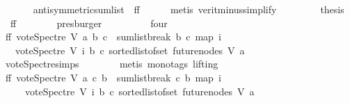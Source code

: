 \begin{isabellebody}
\ \ \ \ \isamarkupfalse%
\ \ antisymmetric{\isacharunderscore}{\kern0pt}sumlist\ {}\ ff{}\isanewline
\ \ \ \ \isamarkupfalse%
\ {\isacharparenleft}{\kern0pt}metis\ verit{\isacharunderscore}{\kern0pt}minus{\isacharunderscore}{\kern0pt}simplify{\isacharparenleft}{\kern0pt}{}{\isacharparenright}{\kern0pt}{\isacharparenright}{\kern0pt}\ \isanewline
\ \ \ \ \isamarkupfalse%
\ \isamarkupfalse%
\ {\isacharquery}{\kern0pt}thesis\ \isamarkupfalse%
\ \ ff\isanewline
\ \ \ \ \ \ \isamarkupfalse%
\ presburger\ \isanewline
\ \ \isamarkupfalse%
\isanewline
\ \ \ \ \isamarkupfalse%
\ four\isanewline
\ \ \ \ \isamarkupfalse%
\ \isamarkupfalse%
\ ff{\isacharcolon}{\kern0pt}\ {\isachardoublequoteopen}vote{\isacharunderscore}{\kern0pt}Spectre\ V\ a\ b\ c\ {\isacharequal}{\kern0pt}\ sumlist{\isacharunderscore}{\kern0pt}break\ b\ c\ {\isacharparenleft}{\kern0pt}map\ {\isacharparenleft}{\kern0pt}{\isasymlambda}i{\isachardot}{\kern0pt}\isanewline
\ \ \ {\isacharparenleft}{\kern0pt}vote{\isacharunderscore}{\kern0pt}Spectre\ V\ i\ b\ c{\isacharparenright}{\kern0pt}{\isacharparenright}{\kern0pt}\ {\isacharparenleft}{\kern0pt}sorted{\isacharunderscore}{\kern0pt}list{\isacharunderscore}{\kern0pt}of{\isacharunderscore}{\kern0pt}set\ {\isacharparenleft}{\kern0pt}future{\isacharunderscore}{\kern0pt}nodes\ V\ a{\isacharparenright}{\kern0pt}{\isacharparenright}{\kern0pt}{\isacharparenright}{\kern0pt}{\isachardoublequoteclose}\isanewline
\ \ \ \ \ \ \isamarkupfalse%
\ vote{\isacharunderscore}{\kern0pt}Spectre{\isachardot}{\kern0pt}simps\isanewline
\ \ \ \ \ \ \isamarkupfalse%
\ {\isacharparenleft}{\kern0pt}metis\ {\isacharparenleft}{\kern0pt}mono{\isacharunderscore}{\kern0pt}tags{\isacharcomma}{\kern0pt}\ lifting{\isacharparenright}{\kern0pt}{\isacharparenright}{\kern0pt}\ \isanewline
\ \ \ \ \isamarkupfalse%
\ ff{}{\isacharcolon}{\kern0pt}\ {\isachardoublequoteopen}vote{\isacharunderscore}{\kern0pt}Spectre\ V\ a\ c\ b\ {\isacharequal}{\kern0pt}\ {\isacharparenleft}{\kern0pt}sumlist{\isacharunderscore}{\kern0pt}break\ c\ b\ {\isacharparenleft}{\kern0pt}map\ {\isacharparenleft}{\kern0pt}{\isasymlambda}i{\isachardot}{\kern0pt}\isanewline
\ \ \ \ {\isacharparenleft}{\kern0pt}{\isacharminus}{\kern0pt}\ vote{\isacharunderscore}{\kern0pt}Spectre\ V\ i\ b\ c{\isacharparenright}{\kern0pt}{\isacharparenright}{\kern0pt}\ {\isacharparenleft}{\kern0pt}sorted{\isacharunderscore}{\kern0pt}list{\isacharunderscore}{\kern0pt}of{\isacharunderscore}{\kern0pt}set\ {\isacharparenleft}{\kern0pt}future{\isacharunderscore}{\kern0pt}nodes\ V\ a{\isacharparenright}{\kern0pt}{\isacharparenright}{\kern0pt}{\isacharparenright}{\kern0pt}{\isacharparenright}{\kern0pt}{\isachardoublequoteclose}\ \isanewline

\end{isabellebody}
